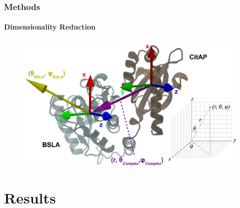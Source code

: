 \documentclass[english]{beamer}
\begin{document}

\begin{frame}
    \frametitle{Methods}
    \framesubtitle{Dimensionality Reduction}

    \begin{figure}
        \includegraphics[width=1.0\textwidth]{figures/Collective_coords/collective_coords.pdf}
    \end{figure}        

\end{frame}     
 

\section{Results}
\end{document}
